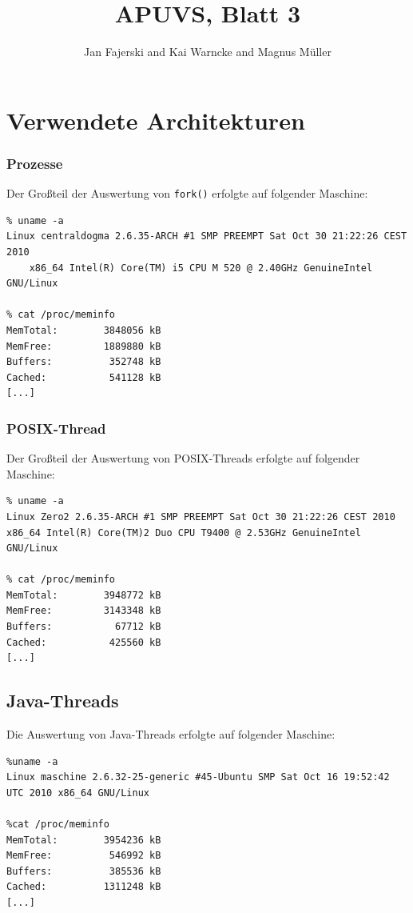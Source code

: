 \documentclass[a4paper,
12pt,
BCOR12mm,
]{scrartcl}
\title{APUVS, Blatt 3}
\author{Jan Fajerski and Kai Warncke and Magnus Müller}
\begin{document}

\maketitle  

\section*{Verwendete Architekturen}
\subsubsection*{Prozesse}
Der Großteil der Auswertung von \verb|fork()| erfolgte auf folgender Maschine:
\begin{verbatim}
% uname -a
Linux centraldogma 2.6.35-ARCH #1 SMP PREEMPT Sat Oct 30 21:22:26 CEST 2010
	x86_64 Intel(R) Core(TM) i5 CPU M 520 @ 2.40GHz GenuineIntel GNU/Linux

% cat /proc/meminfo
MemTotal:        3848056 kB
MemFree:         1889880 kB
Buffers:          352748 kB
Cached:           541128 kB
[...]
\end{verbatim}

\subsubsection*{POSIX-Thread}
Der Großteil der Auswertung von POSIX-Threads erfolgte auf folgender Maschine:
\begin{verbatim}
% uname -a
Linux Zero2 2.6.35-ARCH #1 SMP PREEMPT Sat Oct 30 21:22:26 CEST 2010 
x86_64 Intel(R) Core(TM)2 Duo CPU T9400 @ 2.53GHz GenuineIntel GNU/Linux

% cat /proc/meminfo
MemTotal:        3948772 kB
MemFree:         3143348 kB
Buffers:           67712 kB
Cached:           425560 kB
[...]
\end{verbatim}

\subsection*{Java-Threads}
Die Auswertung von Java-Threads erfolgte auf folgender Maschine:
\begin{verbatim}
%uname -a
Linux maschine 2.6.32-25-generic #45-Ubuntu SMP Sat Oct 16 19:52:42 UTC 2010 x86_64 GNU/Linux

%cat /proc/meminfo
MemTotal:        3954236 kB
MemFree:          546992 kB
Buffers:          385536 kB
Cached:          1311248 kB
[...]
\end{verbatim}
\end{document}
